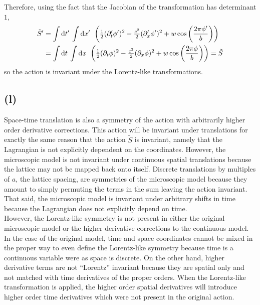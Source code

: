 \documentclass[12pt]{extarticle}
\begin{document}
Therefore, using the fact that the Jacobian of the transformation has determinant $1$,
\begin{align*}
\tilde{S}' & = \int \mathrm{d}t' \: \int \mathrm{d}x' \: \: \left( \tfrac{1}{2} (\partial_t' \phi')^2 - \tfrac{c^2}{2} (\partial_x' \phi')^2 + w \cos \left(\frac{2 \pi \phi'}{b} \right) \right) 
\\
& = \int \mathrm{d}t \: \int \mathrm{d}x \: \: \left( \tfrac{1}{2} (\partial_t \phi)^2 - \tfrac{c^2}{2} (\partial_x \phi)^2 + w \cos \left(\frac{2 \pi \phi}{b} \right) \right) = \tilde{S} 
\end{align*}
so the action is invariant under the Lorentz-like transformations. 
\subsection*{(l)}
Space-time translation is also a symmetry of the action with arbitrarily higher order derivative corrections. This action will be invariant under translations for exactly the same reason that the action $\tilde{S}$ is invariant, namely that the Lagrangian is not explicitly dependent on the coordinates. However, the microscopic model is not invariant under continuous spatial translations because the lattice may not be mapped back onto itself. Discrete translations by multiples of $a$, the lattice spacing, are symmetries of the microscopic model because they amount to simply permuting the terms in the sum leaving the action invariant. That said, the microscopic model is invariant under arbitrary shifts in time because the Lagrangian does not explicitly depend on time.
\bigskip \\
However, the Lorentz-like symmetry is not present in either the original microscopic model or the higher derivative corrections to the continuous model. In the case of the original model, time and space coordinates cannot be mixed in the proper way to even define the Lorentz-like symmetry because time is a continuous variable were as space is discrete. On the other hand, higher derivative terms are not ``Lorentz'' invariant because they are spatial only and not matched with time derivatives of the proper orders. When the Lorentz-like transformation is applied, the higher order spatial derivatives will introduce higher order time derivatives which were not present in the original action. \bigskip \\
\end{document}
